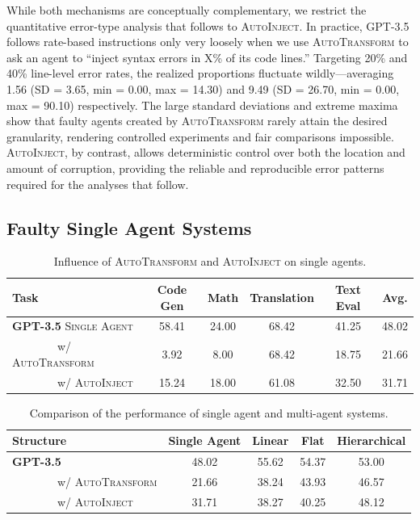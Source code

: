 \documentclass{article}
\theoremstyle{plain}
\theoremstyle{definition}
\theoremstyle{remark}
\begin{document}
While both mechanisms are conceptually complementary, we restrict the quantitative error-type analysis that follows to \textsc{AutoInject}.
In practice, GPT-3.5 follows rate-based instructions only very loosely when we use \textsc{AutoTransform} to ask an agent to ``inject syntax errors in X\% of its code lines.''
Targeting 20\% and 40\% line-level error rates, the realized proportions fluctuate wildly—averaging 1.56 (SD = 3.65, min = 0.00, max = 14.30) and 9.49 (SD = 26.70, min = 0.00, max = 90.10) respectively.
The large standard deviations and extreme maxima show that faulty agents created by \textsc{AutoTransform} rarely attain the desired granularity, rendering controlled experiments and fair comparisons impossible.
\textsc{AutoInject}, by contrast, allows deterministic control over both the location and amount of corruption, providing the reliable and reproducible error patterns required for the analyses that follow.

\subsection{Faulty Single Agent Systems}

\begin{table}[h!]
    \centering
    \caption{Influence of \textsc{AutoTransform} and \textsc{AutoInject} on single agents.}
    \label{tab:single-agent}
    \begin{tabular}{lccccc}
        \toprule
        \bf Task & \bf Code Gen & \bf Math & \bf Translation & \bf Text Eval & \sc Avg. \\
        \midrule
        \textbf{GPT-3.5} {\small \textsc{Single Agent}} & 58.41 & 24.00 & 68.42 & 41.25 & 48.02 \\
        {\small ~~~~~~~~w/ \textsc{AutoTransform}} & 3.92 & 8.00 & 68.42 & 18.75 & 21.66 \\
        {\small ~~~~~~~~w/ \textsc{AutoInject}} & 15.24 & 18.00 & 61.08 & 32.50 & 31.71 \\
        \bottomrule
    \end{tabular}
\end{table}

\begin{table}[h!]
    \centering
    \caption{Comparison of the performance of single agent and multi-agent systems.}
    \label{tab:single-agent-multi-agent}
    \begin{tabular}{lcccc}
        \toprule
        \bf Structure & \bf Single Agent & \bf Linear & \bf Flat & \bf Hierarchical \\
        \midrule
        \textbf{GPT-3.5} & 48.02 & 55.62 & 54.37 & 53.00 \\
        {\small ~~~~~~~~w/ \textsc{AutoTransform}} & 21.66 & 38.24 & 43.93 & 46.57 \\
        {\small ~~~~~~~~w/ \textsc{AutoInject}} & 31.71 & 38.27 & 40.25 & 48.12 \\
        \bottomrule
    \end{tabular}
\end{table}
\end{document}
